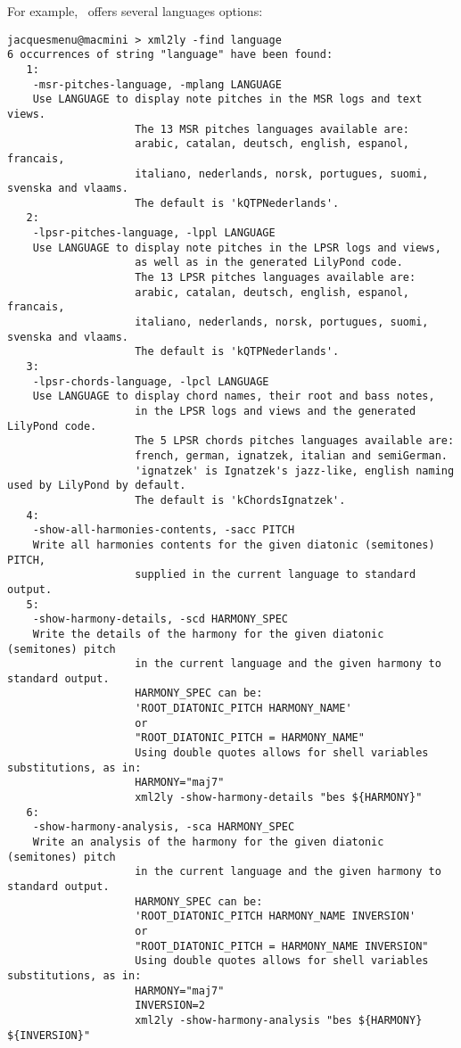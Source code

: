 For example, \xmlToLy\ offers several languages options:
\begin{lstlisting}[language=Terminal]
jacquesmenu@macmini > xml2ly -find language
6 occurrences of string "language" have been found:
   1:
    -msr-pitches-language, -mplang LANGUAGE
    Use LANGUAGE to display note pitches in the MSR logs and text views.
                    The 13 MSR pitches languages available are:
                    arabic, catalan, deutsch, english, espanol, francais,
                    italiano, nederlands, norsk, portugues, suomi, svenska and vlaams.
                    The default is 'kQTPNederlands'.
   2:
    -lpsr-pitches-language, -lppl LANGUAGE
    Use LANGUAGE to display note pitches in the LPSR logs and views,
                    as well as in the generated LilyPond code.
                    The 13 LPSR pitches languages available are:
                    arabic, catalan, deutsch, english, espanol, francais,
                    italiano, nederlands, norsk, portugues, suomi, svenska and vlaams.
                    The default is 'kQTPNederlands'.
   3:
    -lpsr-chords-language, -lpcl LANGUAGE
    Use LANGUAGE to display chord names, their root and bass notes,
                    in the LPSR logs and views and the generated LilyPond code.
                    The 5 LPSR chords pitches languages available are:
                    french, german, ignatzek, italian and semiGerman.
                    'ignatzek' is Ignatzek's jazz-like, english naming used by LilyPond by default.
                    The default is 'kChordsIgnatzek'.
   4:
    -show-all-harmonies-contents, -sacc PITCH
    Write all harmonies contents for the given diatonic (semitones) PITCH,
                    supplied in the current language to standard output.
   5:
    -show-harmony-details, -scd HARMONY_SPEC
    Write the details of the harmony for the given diatonic (semitones) pitch
                    in the current language and the given harmony to standard output.
                    HARMONY_SPEC can be:
                    'ROOT_DIATONIC_PITCH HARMONY_NAME'
                    or
                    "ROOT_DIATONIC_PITCH = HARMONY_NAME"
                    Using double quotes allows for shell variables substitutions, as in:
                    HARMONY="maj7"
                    xml2ly -show-harmony-details "bes ${HARMONY}"
   6:
    -show-harmony-analysis, -sca HARMONY_SPEC
    Write an analysis of the harmony for the given diatonic (semitones) pitch
                    in the current language and the given harmony to standard output.
                    HARMONY_SPEC can be:
                    'ROOT_DIATONIC_PITCH HARMONY_NAME INVERSION'
                    or
                    "ROOT_DIATONIC_PITCH = HARMONY_NAME INVERSION"
                    Using double quotes allows for shell variables substitutions, as in:
                    HARMONY="maj7"
                    INVERSION=2
                    xml2ly -show-harmony-analysis "bes ${HARMONY} ${INVERSION}"
\end{lstlisting}
